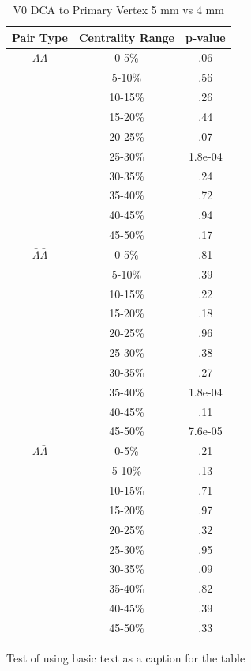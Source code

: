 \begin{table}
\caption {V0 DCA to Primary Vertex 5 mm vs 4 mm} \label{tab:V0DcaPrimVertPvalueTests5mmVs4mm} 
\begin{center}
\begin{tabular}{| c | c | c |}
  \hline                       
  Pair Type & Centrality Range & p-value \\
  \hline
  $\Lambda\Lambda$ & 0-5\% & .06  \\
   & 5-10\%  & .56 \\
   & 10-15\% & .26 \\
   & 15-20\% & .44 \\
   & 20-25\% & .07 \\
   & 25-30\% & 1.8e-04 \\
   & 30-35\% & .24 \\
   & 35-40\% & .72 \\
   & 40-45\% & .94 \\
   & 45-50\% & .17 \\
   \hline
  $\bar{\Lambda}\bar{\Lambda}$ &  0-5\% & .81 \\
   & 5-10\% & .39 \\
   & 10-15\% & .22 \\
   & 15-20\% & .18 \\
   & 20-25\% & .96 \\
   & 25-30\% & .38 \\
   & 30-35\% & .27 \\
   & 35-40\% & 1.8e-04 \\
   & 40-45\% & .11 \\
   & 45-50\% & 7.6e-05 \\
   \hline
  $\Lambda\bar{\Lambda}$ &  0-5\% & .21 \\
   & 5-10\% & .13 \\
   & 10-15\% & .71 \\
   & 15-20\% & .97 \\
   & 20-25\% & .32 \\
   & 25-30\% & .95 \\
   & 30-35\% & .09 \\
   & 35-40\% & .82 \\
   & 40-45\% & .39 \\
   & 45-50\% & .33 \\
  \hline  
\end{tabular}
Test of using basic text as a caption for the table
\end{center}
\end{table}




